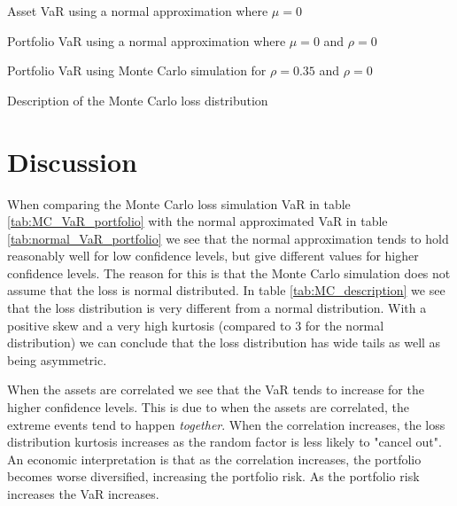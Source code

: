 \documentclass[a4paper]{article}
\begin{document}
\begin{table}[H]
    \centering
    \caption{Asset VaR using a normal approximation where $\mu = 0$}
    \label{tab:normal_VaR_asset}
    
\end{table}

\begin{table}[H]
    \centering
    \caption{Portfolio VaR using a normal approximation where $\mu = 0$ and $\rho = 0$}
    \label{tab:normal_VaR_portfolio}
    
\end{table}

\begin{table}[H]
    \centering
    \caption{Portfolio VaR using Monte Carlo simulation for $\rho = 0.35$ and $\rho = 0$}
    \label{tab:MC_VaR_portfolio}
    
\end{table}

\begin{table}[H]
    \centering
    \caption{Description of the Monte Carlo loss distribution}
    \label{tab:MC_description}
    
\end{table}

\section{Discussion}
When comparing the Monte Carlo loss simulation VaR in table \ref{tab:MC_VaR_portfolio} with the normal approximated VaR in table \ref{tab:normal_VaR_portfolio} we see that the normal approximation tends to hold reasonably well for low confidence levels, but give different values for higher confidence levels. The reason for this is that the Monte Carlo simulation does not assume that the loss is normal distributed. In table \ref{tab:MC_description} we see that the loss distribution is very different from a normal distribution. With a positive skew and a very high kurtosis (compared to $3$ for the normal distribution) we can conclude that the loss distribution has wide tails as well as being asymmetric.

When the assets are correlated we see that the VaR tends to increase for the higher confidence levels. This is due to when the assets are correlated, the extreme events tend to happen \textit{together}. When the correlation increases, the loss distribution kurtosis increases as the random factor is less likely to "cancel out". An economic interpretation is that as the correlation increases, the portfolio becomes worse diversified, increasing the portfolio risk. As the portfolio risk increases the VaR increases.
\end{document}
